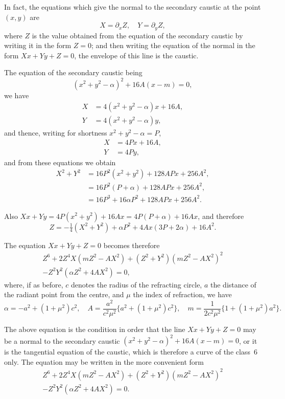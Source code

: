 \documentclass[12pt,a4paper]{article}
\theoremstyle{definition}
\begin{document}
In fact, the equations which give the normal to the secondary
caustic at the point $(x, y)$ are
\[
X = \partial_{x}Z, \quad Y = \partial_{y}Z,
\]
where $Z$ is the value obtained from the equation of the secondary
caustic by writing it in the form $Z = 0$; and then writing the
equation of the normal in the form $Xx + Yy + Z = 0$, the envelope
of this line is the caustic.

The equation of the secondary caustic being
\[
(x^{2} + y^{2} - \alpha)^{2} + 16A(x - m) = 0,
\]
we have
\begin{align*}
X &= 4(x^{2} + y^{2} - \alpha)x + 16A, \\
Y &= 4(x^{2} + y^{2} - \alpha)y,
\end{align*}
and thence, writing for shortness $x^{2} + y^{2} - \alpha = P$,
\begin{align*}
X &= 4Px + 16A, \\
Y &= 4Py,
\end{align*}
and from these equations we obtain
\begin{align*}
X^{2} + Y^{2} &= 16P^{2}(x^{2} + y^{2}) + 128APx + 256A^{2}, \\
&= 16P^{2}(P + \alpha) + 128APx + 256A^{2}, \\
&= 16P^{3} + 16\alpha P^{2} + 128APx + 256A^{2}.
\end{align*}

Also $Xx + Yy = 4P(x^{2} + y^{2}) + 16Ax = 4P(P + \alpha) + 16Ax$,
and therefore
\[
Z = -\tfrac{1}{4}(X^{2} + Y^{2}) + \alpha P^{2} + 4Ax(3P + 2\alpha) + 16A^{2}.
\]

The equation $Xx + Yy + Z = 0$ becomes therefore
\begin{multline*}
Z^{6} + 2Z^{4}X(mZ^{2} - AX^{2}) + (Z^{2} + Y^{2})(mZ^{2} - AX^{2})^{2} \\
- Z^{2}Y^{2}(\alpha Z^{2} + 4AX^{2}) = 0,
\end{multline*}
where, if as before, $c$ denotes the radius of the refracting circle,
$a$ the distance of the radiant point from the centre, and $\mu$
the index of refraction, we have
\[
\alpha = -a^{2} + (1 + \mu^{2})c^{2}, \quad
A = \frac{a^{2}}{c^{2}\mu^{2}} \{ a^{2} + (1 + \mu^{2})c^{2} \}, \quad
m = \frac{1}{2c^{2}\mu^{2}} \{ 1 + (1 + \mu^{2})a^{2} \}.
\]

The above equation is the condition in order that the line
$Xx + Yy + Z = 0$ may be a normal to the secondary caustic
$(x^{2} + y^{2} - \alpha)^{2} + 16A(x - m) = 0$, or it is the tangential
equation of the caustic, which is therefore a curve of the class~6 only.
The equation may be written in the more convenient form
\begin{multline*}
Z^{6} + 2Z^{4}X(mZ^{2} - AX^{2}) + (Z^{2} + Y^{2})(mZ^{2} - AX^{2})^{2} \\
- Z^{2}Y^{2}(\alpha Z^{2} + 4AX^{2}) = 0.
\end{multline*}
\end{document}
